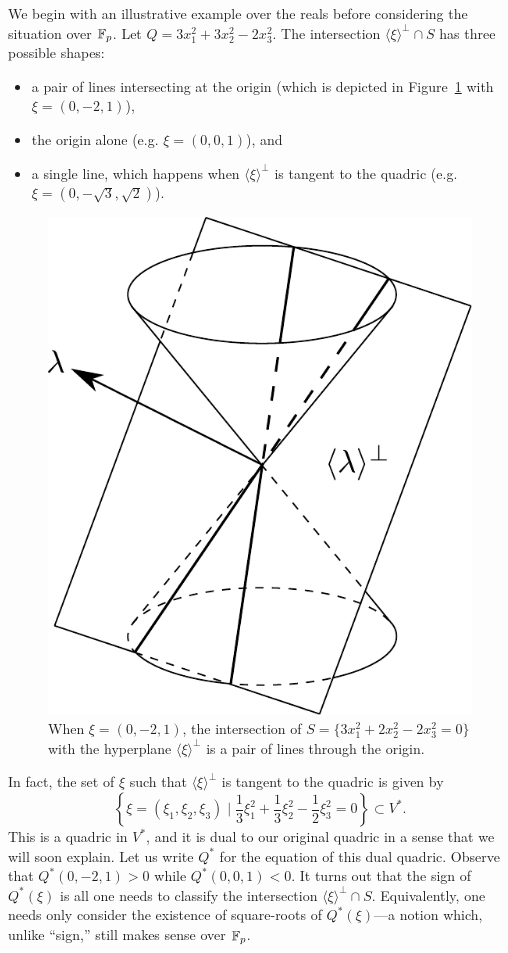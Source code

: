 We begin with an illustrative example over the reals before considering the situation over $\mathbb{F}_p$. Let $Q = 3x_1^2 + 3x_2^2 - 2x_3^2$.
The intersection $\langle \xi \rangle^\bot \cap S$ has three possible shapes:
\begin{itemize}
	\item a pair of lines intersecting at the origin (which is depicted in Figure~\ref{fig:conic-with-plane} with $\xi = (0,-2,1)$),
	\item the origin alone (e.g. $\xi = (0,0,1)$), and
	\item a single line, which happens when $\langle \xi \rangle^\bot$ is tangent to the quadric (e.g. $\xi = (0,-\sqrt{3},\sqrt{2})$).
\end{itemize}
\begin{figure}[h]
	\centering
	\includegraphics[width=0.6\linewidth]{conic-with-plane}
	\caption{When $\xi=(0,-2,1)$, the intersection of $S = \{3x_1^2 + 2x_2^2 - 2x_3^2 = 0\}$ with the hyperplane $\langle \xi \rangle^\bot$ is a pair of lines through the origin.}
	\label{fig:conic-with-plane}
\end{figure}
In fact, the set of $\xi$ such that $\langle \xi \rangle^\bot$ is tangent to the quadric is given by
\[
	\left\{ \xi = (\xi_1,\xi_2,\xi_3) \mid \frac{1}{3} \xi_1^2 + \frac{1}{3} \xi_2^2 - \frac{1}{2} \xi_3^2 = 0 \right\} \subset V^*.
\]
This is a quadric in $V^*$, and it is dual to our original quadric in a sense that we will soon explain. Let us write $Q^*$ for the equation of this dual quadric. Observe that $Q^*(0,-2,1) > 0$ while $Q^*(0,0,1) < 0$. It turns out that the sign of $Q^*(\xi)$ is all one needs to classify the intersection $\langle \xi \rangle^\bot \cap S$. Equivalently, one needs only consider the existence of square-roots of $Q^*(\xi)$---a notion which, unlike ``sign,'' still makes sense over $\mathbb{F}_p$.

